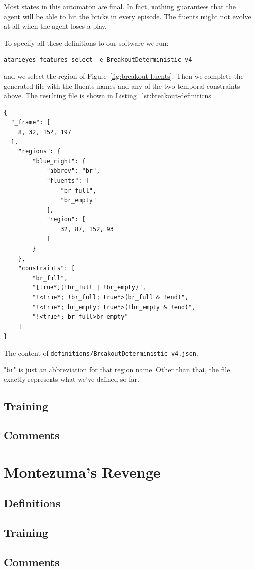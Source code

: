 Most states in this automaton are final. In fact, nothing guarantees that the
agent will be able to hit the bricks in every episode. The fluents might not
evolve at all when the agent loses a play.

To specify all these definitions to our software we run:
\begin{lstlisting}[style=bash]
atarieyes features select -e BreakoutDeterministic-v4
\end{lstlisting}
and we select the region of Figure~\ref{fig:breakout-fluents}. Then we
complete the generated file with the fluents names and any of the two temporal
constraints above. The resulting file is shown in
Listing~\ref{lst:breakout-definitions}. 
\begin{listing}
	\begin{verbatim}
{
  "_frame": [
    8, 32, 152, 197
  ],
	"regions": {
		"blue_right": {
			"abbrev": "br",
			"fluents": [
				"br_full",
				"br_empty"
			],
			"region": [
				32, 87, 152, 93
			]
		}
	},
	"constraints": [
		"br_full",
		"[true*](!br_full | !br_empty)",
		"!<true*; !br_full; true*>(br_full & !end)",
		"!<true*; br_empty; true*>(!br_empty & !end)",
		"!<true*; br_full>br_empty"
	]
}
	\end{verbatim}
	\caption{The content of \texttt{definitions/BreakoutDeterministic-v4.json}.}
	\label{lst:breakout-definitions}
\end{listing}
"\texttt{br}" is just an abbreviation for that region name. Other than that,
the file exactly represents what we've defined so far.


\subsection{Training}
\subsection{Comments}


\let\sectionbreak\savedsectionbreak

\section{Montezuma's Revenge}
\subsection{Definitions}
\subsection{Training}
\subsection{Comments}

